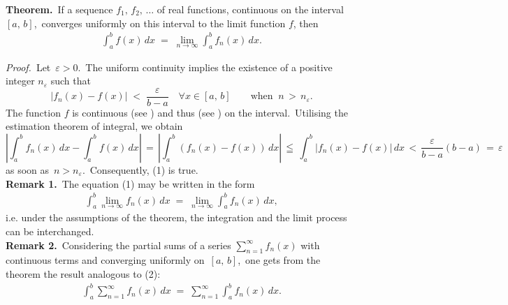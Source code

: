 \documentclass[12pt]{article}
\theoremstyle{definition}
\begin{document}
\textbf{Theorem.}\, If a sequence $f_1,\,f_2,\,\ldots$ of real functions, continuous on the interval \,$[a,\,b]$,\, converges uniformly on this interval to the limit function $f$, then
\begin{align}
\int_a^b\!f(x)\,dx \;=\; \lim_{n\to\infty}\int_a^b\!f_n(x)\,dx.
\end{align}


\emph{Proof.}\, Let\, $\varepsilon > 0$.\, The uniform continuity implies the existence of a positive integer 
$n_\varepsilon$ such that 
$$|f_n(x)\!-\!f(x)| \;<\; \frac{\varepsilon}{b\!-\!a} \quad \forall x \in [a,\,b] \qquad \mbox{when}\;\; 
n \,>\, n_\varepsilon.$$
The function $f$ is continuous (see ) and thus  (see ) on the interval.\, Utilising the estimation theorem of integral, we obtain
$$\left|\int_a^b\!f_n(x)\,dx\!-\!\int_a^b\!f(x)\,dx\right| \,=\, \left|\int_a^b\!(f_n(x)\!-\!f(x))\,dx\right| 
\,\leqq\, \int_a^b\!|f_n(x)\!-\!f(x)|\,dx \,<\, \frac{\varepsilon}{b\!-\!a}(b\!-\!a) \,=\, \varepsilon$$
as soon as\, $n > n_\varepsilon$.\, Consequently, (1) is true.\\

\textbf{Remark 1.}\, The equation (1) may be written in the form
\begin{align}
\int_a^b\!\lim_{n\to\infty}f_n(x)\,dx \;=\; \lim_{n\to\infty}\int_a^b\!f_n(x)\,dx,
\end{align}
i.e. under the assumptions of the theorem, the integration and the limit process can be interchanged.\\

\textbf{Remark 2.}\, Considering the partial sums of a series $\sum_{n=1}^\infty f_n(x)$ with continuous terms and converging uniformly on\, $[a,\,b]$,\, one gets from the theorem the result analogous to (2):
\begin{align}
\int_a^b\!\sum_{n=1}^\infty f_n(x)\,dx \;=\; \sum_{n=1}^\infty\int_a^b\!f_n(x)\,dx.
\end{align}


\end{document}
